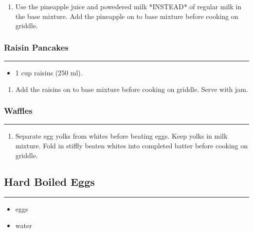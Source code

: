 \documentclass{article}
\begin{document}
\begin{enumerate}
    \item 
        Use the pineapple juice and powedered milk *INSTEAD* of regular milk in the base mixture. Add the pineapple on to base mixture before cooking on griddle.
\end{enumerate}

\subsubsection{Raisin Pancakes} 
\noindent\rule[0.5ex]{\linewidth}{0.5pt}

\begin{framed}
    \begin{itemize}
        \item 1 cup raisins (250 ml). 
    \end{itemize}
\end{framed}

\begin{enumerate}
    \item 
        Add the raisins on to base mixture before cooking on griddle. Serve with jam.
\end{enumerate}

\subsubsection{Waffles} 
\noindent\rule[0.5ex]{\linewidth}{0.5pt}

\begin{enumerate}
    \item 
        Separate egg yolks from whites before beating eggs. Keep yolks in milk mixture. Fold in stiffly beaten whites into completed batter before cooking on griddle.
\end{enumerate}
\newpage 

\subsection{Hard Boiled Eggs} 
\noindent\rule[0.5ex]{\linewidth}{1pt}

\begin{framed}
    \begin{itemize}
        \item eggs
        \item water
    \end{itemize}
\end{framed}
\end{document}
